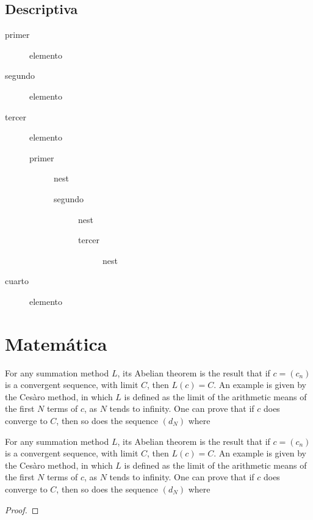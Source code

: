 \documentclass[theorems,spanish,code]{HomeWork}
\begin{document}
\begin{minipage}{0.5\textwidth}
\subsection{Descriptiva}
\begin{description}
    \item[primer] elemento
    \item[segundo] elemento
    \item[tercer] elemento
    \begin{description}
        \item[primer] nest
        \begin{description}
            \item[segundo] nest
            \begin{description}
                \item[tercer] nest
            \end{description}
        \end{description}
    \end{description}
    \item[cuarto] elemento
\end{description}
\end{minipage}

\section{Matemática}
\kant[4]
\begin{theorem}[Subtítulo]
For any summation method $L$, its Abelian theorem is the result that if $c=(c_n)$ is a convergent sequence, with limit $C$, then $L(c)=C$. An example is given by the Cesàro method, in which $L$ is defined as the limit of the arithmetic means of the first $N$ terms of $c$, as $N$ tends to infinity. One can prove that if $c$ does converge to $C$, then so does the sequence $(d_N)$ where
\end{theorem}
\kant[5]
\begin{theorem*}
For any summation method $L$, its Abelian theorem is the result that if $c=(c_n)$ is a convergent sequence, with limit $C$, then $L(c)=C$. An example is given by the Cesàro method, in which $L$ is defined as the limit of the arithmetic means of the first $N$ terms of $c$, as $N$ tends to infinity. One can prove that if $c$ does converge to $C$, then so does the sequence $(d_N)$ where
\end{theorem*}
\kant[6]
\begin{proof}
\kant[7]
\end{proof}
\end{document}
